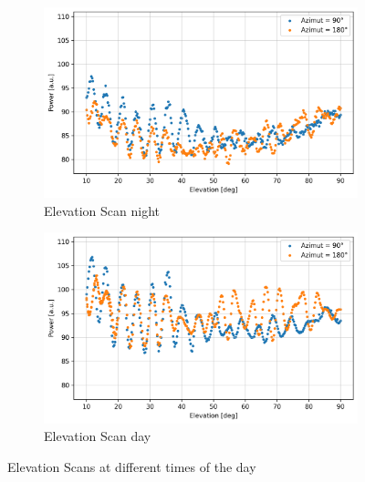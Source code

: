 \begin{figure}[H]
\centering
\begin{subfigure}[t]{0.45\textwidth}
    \centering
    \includegraphics[width=\linewidth]{assets/elev_scan_night.png}
    \caption{Elevation Scan night}
\end{subfigure}
\begin{subfigure}[t]{0.45\textwidth}
    \centering
    \includegraphics[width=\linewidth]{assets/elev_scan_day.png}
    \caption{Elevation Scan day}
\end{subfigure}
\caption{Elevation Scans at different times of the day}
\label{fig:elev_scan}
\end{figure}


%

